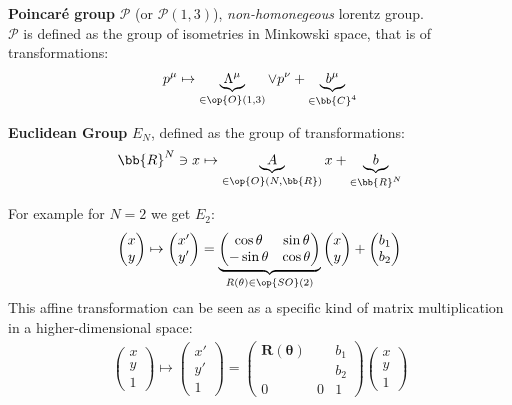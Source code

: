 \documentclass[../Theoretical.tex]{subfiles}
\begin{document}
\begin{dfn}
\textbf{Poincaré group} $\mathcal{P}$ (or $\mathcal{P}(1,3)$), \textit{non-homonegeous} lorentz group.\\
$\mathcal{P}$ is defined as the group of isometries in Minkowski space, that is of transformations:
\begin{align*}
p^\mu \mapsto \underbrace{\Lambda^\mu}_{\in \op{O}(1,3)} \lor p^\nu + \underbrace{b^\mu}_{\in\bb{C}^4}
\end{align*}
\end{dfn}

\begin{dfn}
\textbf{Euclidean Group} $E_N$, defined as the group of transformations:
\begin{align*}
\bb{R}^N \ni x \mapsto \underbrace{A}_{\in \op{O}(N,\bb{R})}x + \underbrace{b}_{\in \bb{R}^N}
\end{align*}
\end{dfn}
For example for $N=2$ we get $E_2$:
\begin{align*}
\begin{pmatrix}x\\y\end{pmatrix} \mapsto \begin{pmatrix}x'\\y'\end{pmatrix} =
\underbrace{\begin{pmatrix}\cos\theta & \sin\theta\\-\sin\theta & \cos\theta\end{pmatrix}}_{R(\theta)\in \op{SO}(2)}\begin{pmatrix}x\\ y\end{pmatrix} + \begin{pmatrix}b_1 \\ b_2\end{pmatrix}
\end{align*}
This affine transformation can be seen as a specific kind of matrix multiplication in a higher-dimensional space:
\begin{align*}
\begin{pmatrix}x\\y\\1\end{pmatrix}\mapsto \begin{pmatrix}x'\\y'\\1\end{pmatrix} = \begin{pmatrix}\bm{R(\theta)} & & b_1\\ & & b_2\\ 0 & 0 & 1\end{pmatrix}\begin{pmatrix}x\\y\\1\end{pmatrix}
\end{align*} %
\end{document}
